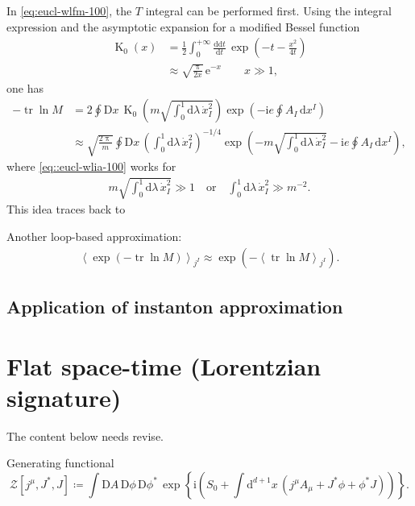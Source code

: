 \documentclass[12pt]{article}
\newcommand\mi{\mathrm{i}} %
\newcommand\me{\mathrm{e}} %
\newcommand\pp{\uppi}
\newcommand\dif{\mathrm{d}}
\newcommand\Dif{\mathrm{D}}
\DeclareMathOperator{\BesselK}{K}
\DeclareMathOperator{\tr}{tr}
\newcommand{\rbr}[1]{{\left(#1\right)}}
\newcommand{\abr}[1]{{\left<#1\right>}}
\newcommand{\rfun}[2]{{#1}\mathopen{}\left(#2\right)\mathclose{}}
\newcommand{\sfun}[2]{{#1}\mathopen{}\left[#2\right]\mathclose{}}
\newcommand{\cfun}[2]{{#1}\mathopen{}\left\{#2\right\}\mathclose{}}
\newcommand{\frde}[2]{{\frac{\dif{#1}}{\dif{#2}}}}
\begin{document}
In \cref{eq:eucl-wlfm-100}, the $T$ integral can be performed first. Using the 
integral expression and the asymptotic expansion for a modified Bessel function
\begin{align}
\rfun{\BesselK_0}{x} &= \frac{1}{2} \int_0^{+\infty} \frde{\dif t}{t}\,
	\rfun{\exp}{-t-\frac{x^2}{4t}}
\\
&\approx \sqrt{\frac{\pp}{2x}}\,\me^{-x}\qquad
	x \gg 1,
\end{align}
one has
\begin{align}
- \tr\ln M &= 2 \oint \Dif x\,
	\rfun{\BesselK_0}{m\sqrt{\int_0^1 \dif\lambda\, \dot{x}_I^2}}
		\rfun{\exp}{- \mi e \oint A_I\,\dif x^I}
\\
&\approx \sqrt{\frac{2\pp}{m}} \oint \Dif x\,
	\rbr{\int_0^1 \dif\lambda\, \dot{x}_I^2}^{-1/4}
	\rfun{\exp}{-m\sqrt{\int_0^1 \dif\lambda\, \dot{x}_I^2}
		- \mi e \oint A_I\,\dif x^I},
\label{eq::eucl-wlia-100}
\end{align}
where \cref{eq::eucl-wlia-100} works for
\begin{align}
m \sqrt{\int_0^1 \dif\lambda\, \dot{x}_I^2} \gg 1
\quad\text{or}\quad
\int_0^1 \dif\lambda\, \dot{x}_I^2 \gg m^{-2}.
\end{align}
This idea traces back to \cite{Affleck1982}


Another loop-based approximation:
\begin{align}
\abr{\rfun{\exp}{-\tr\ln M}}_{j^I} \approx
\rfun{\exp}{-\abr{\tr\ln M}_{j^I}}.
\end{align}



\subsection{Application of instanton approximation}


\cite{Dunne2005}




\section{Flat space-time (Lorentzian signature)}


The content below needs revise.

Generating functional
\begin{equation}
\sfun{\mathcal{Z}}{j^\mu, J^*, J} \coloneqq
\int\Dif A\,\Dif\phi\,\Dif\phi^*\,\cfun{\exp}{\mi\rbr{S_0
+\int\dif^{d+1} x\,\rbr{j^\mu A_\mu + J^* \phi+\phi^* J}}}.
\end{equation}
\end{document}
